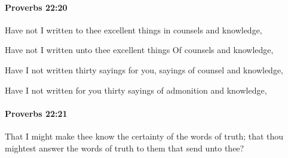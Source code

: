 		\paragraph{Proverbs 22:20} %
			\label{PROVERBS-22-20}

			Have not I written to thee excellent things in counsels and knowledge,

			\begin{versebox}
					\item[BHS] 
					\item[ASV] Have not I written unto thee excellent things Of counsels and knowledge,
					\item[NIV] Have I not written thirty sayings for you, sayings of counsel and knowledge,
					\item[NRSV] Have I not written for you thirty sayings of admonition and knowledge,
			\end{versebox}

		\paragraph{Proverbs 22:21} %
			\label{PROVERBS-22-21}

			That I might make thee know the certainty of the words of truth; that thou mightest answer the words of truth to them that send unto thee?

